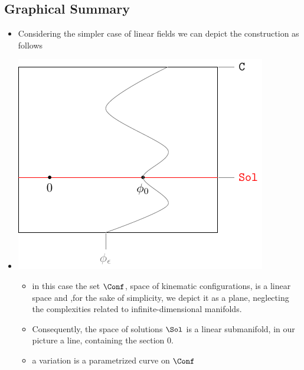\documentclass[a4paper,11pt]{scrartcl}
\begin{document}
    \subsection{Graphical Summary}
    \begin{itemize}
        \item Considering the simpler case of linear fields we can depict the construction as follows
        \item 
        \begin{minipage}{0.4\textwidth}
            \includegraphics[width=\textwidth]{../Pictures/GeometricPicture0}
        \end{minipage}
        \begin{minipage}{0.5\textwidth}
            \begin{itemize}
                \item in this case the set $\Conf$, space of kinematic configurations, is a linear space and 
                    ,for the sake of simplicity, we depict it as a plane, neglecting the complexities related to infinite-dimensional manifolds.
                \item Consequently, the space of solutions $ \Sol$ is a linear submanifold, in our picture a line, containing the section $0$.
                \item a variation is a parametrized curve on $\Conf$
            \end{itemize}
        \end{minipage}


\end{itemize}
\end{document}
